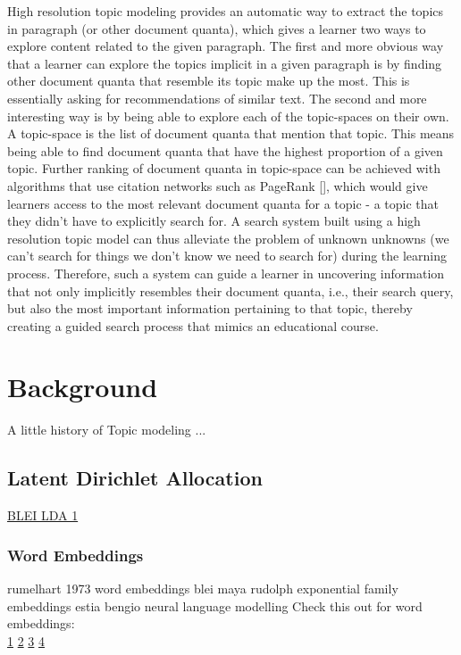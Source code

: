 \documentclass[sigconf]{acmart}
\begin{document}
High resolution topic modeling provides an automatic way to extract the topics in paragraph (or other document quanta), which gives a learner two ways to explore content related to the given paragraph. The first and more obvious way that a learner can explore the topics implicit in a given paragraph is by finding other document quanta that resemble its topic make up the most. This is essentially asking for recommendations of similar text. The second and more interesting way is by being able to explore each of the topic-spaces on their own. A topic-space is the list of document quanta that mention that topic. This means being able to find document quanta that have the highest proportion of a given topic. Further ranking of document quanta in topic-space can be achieved with algorithms that use citation networks such as PageRank [], which would give learners access to the most relevant document quanta for a topic - a topic that they didn't have to explicitly search for.  A search system built using a high resolution topic model can thus alleviate the problem of unknown unknowns (we can't search for things we don't know we need to search for) during the learning process. Therefore, such a system can guide a learner in uncovering information that not only implicitly resembles their document quanta, i.e., their search query, but also the most important information pertaining to that topic, thereby creating a guided search process that mimics an educational course.  


\section{Background}
A little history of Topic modeling ...


\subsection{Latent Dirichlet Allocation}

\href{http://www.cse.cuhk.edu.hk/irwin.king/_media/presentations/latent_dirichlet_allocation.pdf}{BLEI LDA 1}
\subsubsection{Word Embeddings}
rumelhart 1973 word embeddings
blei maya rudolph exponential family embeddings
estia bengio neural language modelling
Check this out for word embeddings:\\
\href{https://towardsdatascience.com/lda2vec-word-embeddings-in-topic-models-4ee3fc4b2843}{1}
\href{https://multithreaded.stitchfix.com/blog/2016/05/27/lda2vec/#topic=3&lambda=1&term=}{2}
\href{https://www.aclweb.org/anthology/P15-1077.pdf}{3}
\href{https://arxiv.org/pdf/1604.00126.pdf }{4}
\end{document}
